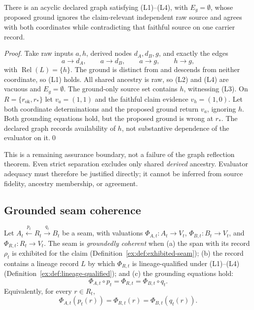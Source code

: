 \documentclass[smallextended,envcountsect,envcountsame,natbib]{svjour3}
\begin{document}
\begin{proposition}\label{ex:prop:raw-ignored-source}
There is an acyclic declared graph satisfying (L1)--(L4), with $E_g=\emptyset$, whose proposed ground ignores the claim-relevant independent raw source and agrees with both coordinates while contradicting that faithful source on one carrier record.
\end{proposition}
\begin{proof}
Take raw inputs $a,h$, derived nodes $d_A,d_B,g$, and exactly the edges
\[
a\to d_A,\qquad a\to d_B,\qquad a\to g,\qquad h\to g,
\]
with $\operatorname{Rel}(L)=\{h\}$. The ground is distinct from and descends from neither coordinate, so (L1) holds. All shared ancestry is raw, so (L2) and (L4) are vacuous and $E_g=\emptyset$. The ground-only source set contains $h$, witnessing (L3). On $R=\{r_{\mathrm{ok}},r_*\}$ let $v_a=(1,1)$ and the faithful claim evidence $v_h=(1,0)$. Let both coordinate determinations and the proposed ground return $v_a$, ignoring $h$. Both grounding equations hold, but the proposed ground is wrong at $r_*$. The declared graph records availability of $h$, not substantive dependence of the evaluator on it.\qed
\end{proof}

This is a remaining assurance boundary, not a failure of the graph reflection theorem. Even strict separation excludes only shared \emph{derived} ancestry. Evaluator adequacy must therefore be justified directly; it cannot be inferred from source fidelity, ancestry membership, or agreement.

\subsection{Grounded seam coherence}\label{ex:sec:grounded-coherence}

\begin{definition}\label{ex:def:grounded-seam}
Let $A_t \xleftarrow{p_t} R_t
\xrightarrow{q_t} B_t$ be a seam, with valuations
$\Phi_{A,t}:A_t\to V_t$, $\Phi_{B,t}:B_t\to V_t$, and
$\Phi_{R,t}:R_t\to V_t$. The seam is \emph{groundedly coherent} when (a) the span with its record $\rho_t$ is exhibited for the claim (Definition~\ref{ex:def:exhibited-seam}); (b) the record contains a lineage record $L$ by which $\Phi_{R,t}$ is lineage-qualified under (L1)--(L4) (Definition~\ref{ex:def:lineage-qualified}); and (c) the grounding equations hold:
\[
\Phi_{A,t}\circ p_t
=\Phi_{R,t}
=\Phi_{B,t}\circ q_t.
\]
Equivalently, for every $r\in R_t$,
\[
\Phi_{A,t}(p_t(r))
=\Phi_{R,t}(r)
=\Phi_{B,t}(q_t(r)).
\]
\end{definition}
\end{document}
